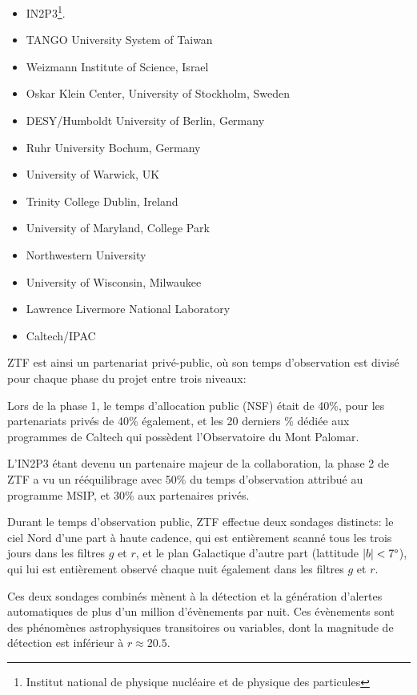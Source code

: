 \documentclass[../main/main.tex]{subfiles}
\begin{document}
\begin{multicols}{2}
\begin{itemize}[noitemsep, label=$\bullet$]
    \item IN2P3\footnote{Institut national de physique nucléaire et de physique
    des particules}.
    \item TANGO University System of Taiwan
    \item Weizmann Institute of Science, Israel
    \item Oskar Klein Center, University of Stockholm, Sweden
    \item DESY/Humboldt University of Berlin, Germany
    \item Ruhr University Bochum, Germany
    \item University of Warwick, UK
    \item Trinity College Dublin, Ireland
    \item University of Maryland, College Park
    \item Northwestern University
    \item University of Wisconsin, Milwaukee
    \item Lawrence Livermore National Laboratory
    \item Caltech/IPAC
\end{itemize}
\end{multicols}

ZTF est ainsi un partenariat privé-public, où son temps d'observation
est divisé pour chaque phase du projet entre trois niveaux:

Lors de la phase 1, le temps d'allocation public (NSF) était de 40\%,
pour les partenariats privés de 40\% également, et les 20 derniers \%
dédiée aux programmes de Caltech qui possèdent l'Observatoire du Mont
Palomar.

L'IN2P3 étant devenu un partenaire majeur de la collaboration, la phase 2
de ZTF a vu un rééquilibrage avec 50\% du temps d'observation attribué
au programme MSIP, et 30\% aux partenaires privés.

Durant le temps d'observation public, ZTF effectue deux sondages distincts: le ciel
Nord d'une part à haute cadence, qui est entièrement scanné tous les trois jours dans les
filtres $g$ et $r$, et le plan
Galactique d'autre part (lattitude $|b|<7\degree$), qui lui est entièrement observé chaque nuit
également dans les filtres $g$ et $r$.

Ces deux sondages combinés mènent à la détection et la génération
d'alertes automatiques de plus d'un million d'évènements par nuit. Ces
évènements sont des phénomènes astrophysiques transitoires ou variables,
dont la magnitude de détection est inférieur à $r\approx 20.5$.
\end{document}
